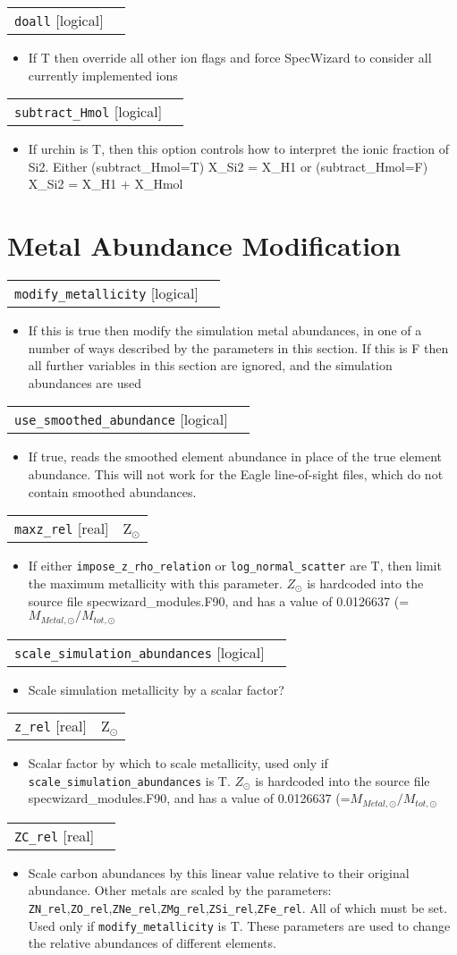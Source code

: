 \documentclass{report}
\makeatletter
\newcommand{\paramdefinition}[3]{
\begin{tabular*}{\textwidth}{l@{\extracolsep{\fill}}r}
		{\tt #1} [{\sc #2}]& #3 \\
\end{tabular*}}
\newcommand{\paramdescription}[1]{
\begin{itemize}
\item #1
\end{itemize}\vspace{0.2cm}}
\makeatother
\begin{document}
\paramdefinition{doall}{logical}{}
\paramdescription{If T then override all other ion flags and force SpecWizard to consider all currently implemented ions}

\paramdefinition{subtract\_Hmol}{logical}{}
\paramdescription{If urchin is T, then this option controls how to interpret the ionic fraction of Si2. Either (subtract\_Hmol=T) X\_Si2 = X\_H1 or (subtract\_Hmol=F) X\_Si2 = X\_H1 + X\_Hmol}

\section{Metal Abundance Modification}
\paramdefinition{modify\_metallicity}{logical}{ }
\paramdescription{If this is true then modify the simulation metal abundances, in one of a number of ways described by the parameters in this section.  If this is F then all further variables in this section are ignored, and the simulation abundances are used}

\paramdefinition{use\_smoothed\_abundance}{logical}{}
\paramdescription{If true, reads the smoothed element abundance in place of the true element abundance. This will not work for the Eagle line-of-sight files, which do not contain smoothed abundances.}

\paramdefinition{maxz\_rel}{real}{Z$_{\odot}$}
\paramdescription{If either {\tt impose\_z\_rho\_relation} or {\tt log\_normal\_scatter} are T, then limit the maximum metallicity with this parameter.  $Z_{\odot}$ is hardcoded into the source file specwizard\_modules.F90, and has a value of 0.0126637  (=$M_{Metal,\odot}/M_{tot,\odot}$}

\paramdefinition{scale\_simulation\_abundances}{logical}{ }
\paramdescription{Scale simulation metallicity by a scalar factor?}

\paramdefinition{z\_rel}{real}{Z$_{\odot}$}
\paramdescription{Scalar factor by which to scale metallicity, used only if {\tt scale\_simulation\_abundances} is T.   $Z_{\odot}$ is hardcoded into the source file specwizard\_modules.F90, and has a value of 0.0126637  (=$M_{Metal,\odot}/M_{tot,\odot}$}

\paramdefinition{ZC\_rel}{real}{}
\paramdescription{Scale carbon abundances by this linear value relative to their original abundance.  Other metals are scaled by the parameters: {\tt ZN\_rel},{\tt ZO\_rel},{\tt ZNe\_rel},{\tt ZMg\_rel},{\tt ZSi\_rel},{\tt ZFe\_rel}.  All of which must be set.  Used only if {\tt modify\_metallicity} is T.  These parameters are used to change the relative abundances of different elements.}
\end{document}
